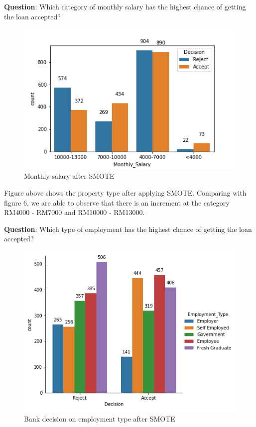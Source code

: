 \documentclass[11pt]{article}
\begin{document}
\noindent \textbf{Question}: Which category of monthly salary has the highest chance of getting the loan accepted?
\begin{figure}[h]
\centerline{\includegraphics[scale=0.8]{aSMOTE_month_salary.png} }
\label{fig:aSmoteMonthSalary}
\caption{Monthly salary after SMOTE}
\end{figure}

Figure above shows the property type after applying SMOTE. Comparing with figure 6, we are able to observe that there is an increment at the category RM4000 - RM7000 and RM10000 - RM13000.
\clearpage

\noindent \textbf{Question}: Which type of employment has the highest chance of getting the loan accepted?
\begin{figure}[h]
\centerline{\includegraphics[scale=0.8]{aSMOTE_dcs_employment.png} }
\label{fig:aSmoteDCSemp}
\caption{Bank decision on employment type after SMOTE}
\end{figure}
\end{document}
